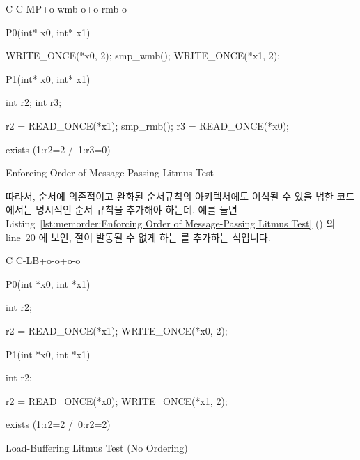 \begin{listing}[tbp]
{ \scriptsize
\begin{verbbox}[\LstLineNo]
C C-MP+o-wmb-o+o-rmb-o

{
}

P0(int* x0, int* x1) {

  WRITE_ONCE(*x0, 2);
  smp_wmb();
  WRITE_ONCE(*x1, 2);

}

P1(int* x0, int* x1) {

  int r2;
  int r3;

  r2 = READ_ONCE(*x1);
  smp_rmb();
  r3 = READ_ONCE(*x0);

}

exists (1:r2=2 /\ 1:r3=0)
\end{verbbox}
}
\centering
\theverbbox
\caption{Enforcing Order of Message-Passing Litmus Test}
\label{lst:memorder:Enforcing Order of Message-Passing Litmus Test}
\end{listing}

따라서, 순서에 의존적이고 완화된 순서규칙의 아키텍쳐에도 이식될 수 있을 법한
코드에서는 명시적인 순서 규칙을 추가해야 하는데, 예를 들면
Listing~\ref{lst:memorder:Enforcing Order of Message-Passing Litmus Test}
()
의 line~20 에 보인,  절이 발동될 수 없게 하는  를
추가하는 식입니다.

\begin{listing}[tbp]
{ \scriptsize
\begin{verbbox}[\LstLineNo]
C C-LB+o-o+o-o
{
}

P0(int *x0, int *x1)
{
  int r2;

  r2 = READ_ONCE(*x1);
  WRITE_ONCE(*x0, 2);
}


P1(int *x0, int *x1)
{
  int r2;

  r2 = READ_ONCE(*x0);
  WRITE_ONCE(*x1, 2);
}

exists (1:r2=2 /\ 0:r2=2)
\end{verbbox}
}
\centering
\theverbbox
\caption{Load-Buffering Litmus Test (No Ordering)}
\label{lst:memorder:Load-Buffering Litmus Test (No Ordering)}
\end{listing}

